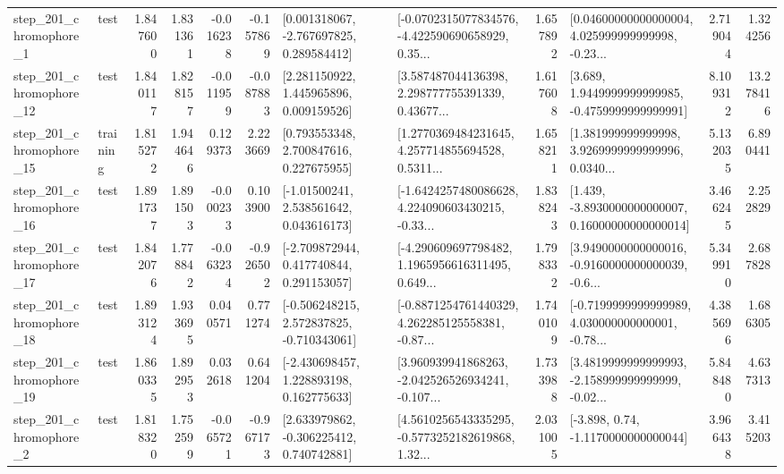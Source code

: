 \begin{tabular}{llrrrrllrlrr}
   step\_201\_chromophore\_1 &      test &      1.847600 &    1.831361 &     -0.016238 & -0.157869 &    [0.001318067, -2.767697825, 0.289584412] &  [-0.0702315077834576, -4.422590690658929, 0.35... &       1.657892 &  [0.04600000000000004, 4.025999999999998, -0.23... &            2.719044 &          1.324256 \\
  step\_201\_chromophore\_12 &      test &      1.840117 &    1.828157 &     -0.011959 & -0.087883 &     [2.281150922, 1.445965896, 0.009159526] &  [3.587487044136398, 2.298777755391339, 0.43677... &       1.617608 &   [3.689, 1.9449999999999985, -0.4759999999999991] &            8.109312 &         13.278416 \\
  step\_201\_chromophore\_15 &  training &      1.815272 &    1.944646 &      0.129373 &  2.223669 &     [0.793553348, 2.700847616, 0.227675955] &  [1.2770369484231645, 4.257714855694528, 0.5311... &       1.658211 &  [1.381999999999998, 3.9269999999999996, 0.0340... &            5.132035 &          6.890441 \\
  step\_201\_chromophore\_16 &      test &      1.891737 &    1.891503 &     -0.000233 &  0.103900 &     [-1.01500241, 2.538561642, 0.043616173] &  [-1.6424257480086628, 4.224090603430215, -0.33... &       1.838243 &  [1.439, -3.8930000000000007, 0.16000000000000014] &            3.466245 &          2.252829 \\
  step\_201\_chromophore\_17 &      test &      1.842076 &    1.778842 &     -0.063234 & -0.926502 &    [-2.709872944, 0.417740844, 0.291153057] &  [-4.290609697798482, 1.1965956616311495, 0.649... &       1.798332 &  [3.9490000000000016, -0.9160000000000039, -0.6... &            5.349910 &          2.687828 \\
  step\_201\_chromophore\_18 &      test &      1.893124 &    1.933695 &      0.040571 &  0.771274 &   [-0.506248215, 2.572837825, -0.710343061] &  [-0.8871254761440329, 4.262285125558381, -0.87... &       1.740109 &  [-0.7199999999999989, 4.030000000000001, -0.78... &            4.385696 &          1.686305 \\
  step\_201\_chromophore\_19 &      test &      1.860335 &    1.892953 &      0.032618 &  0.641204 &    [-2.430698457, 1.228893198, 0.162775633] &  [3.960939941868263, -2.042526526934241, -0.107... &       1.733988 &  [3.4819999999999993, -2.158999999999999, -0.02... &            5.848480 &          4.637313 \\
   step\_201\_chromophore\_2 &      test &      1.818320 &    1.752599 &     -0.065721 & -0.967173 &    [2.633979862, -0.306225412, 0.740742881] &  [4.5610256543335295, -0.5773252182619868, 1.32... &       2.031005 &                [-3.898, 0.74, -1.1170000000000044] &            3.966438 &          3.415203 \\

\end{tabular}
